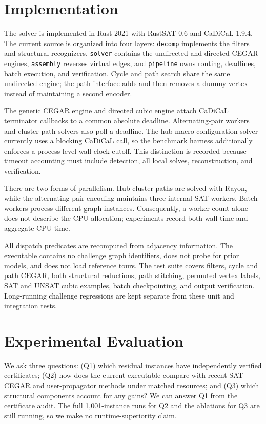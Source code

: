 \documentclass[sigconf,anonymous]{aamas}
\begin{document}
\section{Implementation}
\label{sec:implementation}

The solver is implemented in Rust 2021 with RustSAT 0.6 and CaDiCaL
1.9.4. The current source is organized into four layers:
\texttt{decomp} implements the filters and structural recognizers,
\texttt{solver} contains the undirected and directed CEGAR engines,
\texttt{assembly} reverses virtual edges, and \texttt{pipeline} owns
routing, deadlines, batch execution, and verification. Cycle and path
search share the same undirected engine; the path interface adds and
then removes a dummy vertex instead of maintaining a second encoder.

The generic CEGAR engine and directed cubic engine attach CaDiCaL
terminator callbacks to a common absolute deadline. Alternating-pair
workers and cluster-path solvers also poll a deadline. The hub macro
configuration solver currently uses a blocking CaDiCaL call, so the
benchmark harness additionally enforces a process-level wall-clock
cutoff. This distinction is recorded because timeout accounting must
include detection, all local solves, reconstruction, and verification.

There are two forms of parallelism. Hub cluster paths are solved with
Rayon, while the alternating-pair encoding maintains three internal SAT
workers. Batch workers process different graph instances. Consequently,
a worker count alone does not describe the CPU allocation; experiments
record both wall time and aggregate CPU time.

All dispatch predicates are recomputed from adjacency information. The
executable contains no challenge graph identifiers, does not probe for
prior models, and does not load reference tours. The test suite covers
filters, cycle and path CEGAR, both structural reductions, path stitching,
permuted vertex labels, SAT and UNSAT cubic examples, batch checkpointing,
and output verification. Long-running challenge regressions are kept
separate from these unit and integration tests.

\section{Experimental Evaluation}
\label{sec:experiments}

We ask three questions: (Q1) which residual instances have independently
verified certificates; (Q2) how does the current executable compare with
recent SAT--CEGAR and user-propagator methods under matched resources;
and (Q3) which structural components account for any gains? We can
answer Q1 from the certificate audit. The full 1,001-instance runs for
Q2 and the ablations for Q3 are still running, so we make no
runtime-superiority claim.
\end{document}
